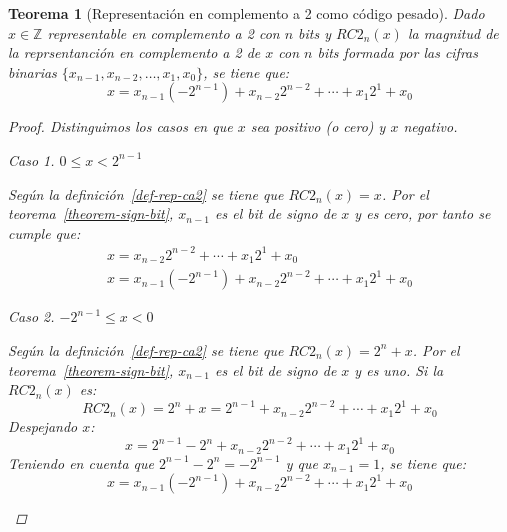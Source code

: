 \documentclass[spanish,a4paper,12pt,titlepage]{article}
\newtheorem{theorem}{Teorema}%
\theoremstyle{definition}
\theoremstyle{remark}
\newtheorem{case}{Caso}
\newcommand{\bbZ}{\mathbb{Z}}
\begin{document}
\begin{theorem}[Representación en complemento a 2 como código pesado]
  Dado $x \in \bbZ$ representable en complemento a 2 con $n$ bits y $RC2_n(x)$ la magnitud de la reprsentanción en complemento a 2 de $x$ con $n$ bits formada por las cifras binarias $\{x_{n-1}, x_{n-2}, \ldots, x_1, x_0\}$, se tiene que:
  \[
      x = x_{n-1} (-2^{n-1})+x_{n-2} 2^{n-2}+ \cdots + x_1 2^1+x_0
  \]
  \begin{proof}
    Distinguimos los casos en que $x$ sea positivo (o cero) y $x$ negativo.

    \begin{case}
      $0 \le x < 2^{n-1}$

      Según la definición~\ref{def-rep-ca2} se tiene que $RC2_n(x) = x$. Por el teorema~\ref{theorem-sign-bit}, $x_{n-1}$ es el bit de signo de $x$ y es cero, por tanto se cumple que:
      \begin{align*}
        x = x_{n-2} 2^{n-2}+ \cdots + x_1 2^1+x_0\\
        x = x_{n-1} (-2^{n-1})+x_{n-2} 2^{n-2}+ \cdots + x_1 2^1+x_0
      \end{align*}
    \end{case}
    \begin{case}
      $-2^{n-1} \le x < 0$

      Según la definición~\ref{def-rep-ca2} se tiene que $RC2_n(x) = 2^n + x$. Por el teorema~\ref{theorem-sign-bit}, $x_{n-1}$ es el bit de signo de $x$ y es uno. Si la $RC2_n(x)$ es:
      \[
        RC2_n(x) = 2^n + x = 2^{n-1}+x_{n-2}2^{n-2}+\cdots+x_1 2^1+x_0
      \]
      Despejando $x$:
      \[
        x = 2^{n-1}-2^n + x_{n-2} 2^{n-2}+ \cdots +x_1 2^1+x_0
      \]
      Teniendo en cuenta que $2^{n-1}-2^n = -2^{n-1}$ y que $x_{n-1}=1$, se tiene que:
      \[
        x = x_{n-1} (-2^{n-1})+x_{n-2} 2^{n-2}+ \cdots + x_1 2^1+x_0
      \]
    \end{case}
  \end{proof}
\end{theorem}
\end{document}
